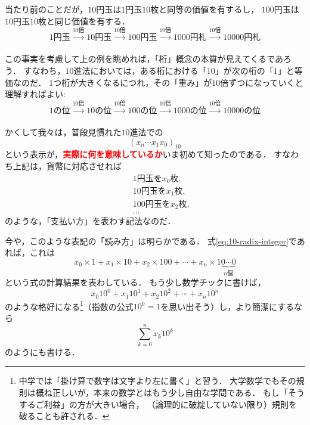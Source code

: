 \documentclass[a5j, uplatex, dvipdfmx]{jsbook}
\newcommand{\emphasize}[1]{\textcolor{red}{\textbf{#1}}}
\begin{document}
    当たり前のことだが，$10$円玉は$1$円玉$10$枚と同等の価値を有するし，
    $100$円玉は$10$円玉$10$枚と同じ価値を有する．
    \begin{equation*}
        1円玉 \xrightarrow[]{10倍} 10円玉 \xrightarrow[]{10倍} 100円玉 \xrightarrow[]{10倍} 1000円札 \xrightarrow[]{10倍} 10000円札
    \end{equation*}

    この事実を考慮して上の例を眺めれば，「桁」概念の本質が見えてくるであろう．
    すなわち，$10$進法においては，ある桁における「$10$」が次の桁の「$1$」と等価なのだ．
    $1$つ桁が大きくなるにつれ，その「重み」が$10$倍ずつになっていくと理解すればよい:
    \begin{equation*}
        1の位 \xrightarrow[]{10倍} 10の位 \xrightarrow[]{10倍} 100の位 \xrightarrow[]{10倍} 1000の位 \xrightarrow[]{10倍} 10000の位
    \end{equation*}

    かくして我々は，普段見慣れた$10$進法での
    \begin{equation}
        (x_n \cdots x_1 x_0)_{10}  \label{eq:10-radix-integer}
    \end{equation}
    という表示が，\emphasize{実際に何を意味しているか}いま初めて知ったのである．
    すなわち上記は，貨幣に対応させれば
    \begin{eqnarray*}
        &&1円玉を x_0 枚, \\
        &&10円玉を x_1 枚, \\
        &&100円玉を x_2 枚, \\
        &&...
    \end{eqnarray*}
    のような，「支払い方」を表わす記法なのだ．

    今や，このような表記の「読み方」は明らかである．
    式\eqref{eq:10-radix-integer}であれば，これは
    \begin{equation*}
        x_0 \times 1 + x_1 \times 10 + x_2 \times 100 + \cdots + x_n \times 1\underbrace{0\cdots 0}_{n個}
    \end{equation*}
    という式の計算結果を表わしている．
    もう少し数学チックに書けば，
    \begin{equation*}
        x_0 10^0 + x_1 10^1 + x_2 10^2 + \cdots + x_n 10^n
    \end{equation*}
    のような格好になる\footnote{
        中学では「掛け算で数字は文字より左に書く」と習う．
        大学数学でもその規則は概ね正しいが，本来の数学とはもう少し自由な学問である．
        もし「そうするご利益」の方が大きい場合，
        （論理的に破綻していない限り）規則を破ることも許される．
    }（指数の公式$10^0 = 1$を思い出そう）し，より簡潔にするなら
    \begin{equation*}
        \sum_{k=0}^n x_k 10^k
    \end{equation*}
    のようにも書ける．
\end{document}
